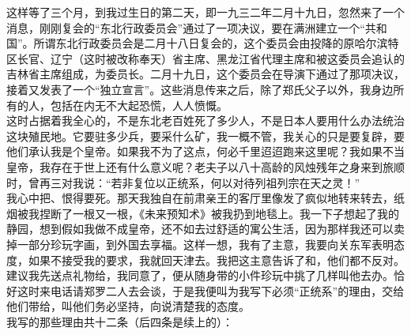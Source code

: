 这样等了三个月，到我过生日的第二天，即一九三二年二月十九日，忽然来了一个消息，刚刚复会的“东北行政委员会”通过了一项决议，要在满洲建立一个“共和国”。所谓东北行政委员会是二月十八日复会的，这个委员会由投降的原哈尔滨特区长官、辽宁（这时被改称奉天）省主席、黑龙江省代理主席和被这委员会追认的吉林省主席组成，为委员长。二月十九日，这个委员会在导演下通过了那项决议，接着又发表了一个“独立宣言”。这些消息传来之后，除了郑氏父子以外，我身边所有的人，包括在内无不大起恐慌，人人愤慨。\\

这时占据着我全心的，不是东北老百姓死了多少人，不是日本人要用什么办法统治这块殖民地。它要驻多少兵，要采什么矿，我一概不管，我关心的只是要复辟，要他们承认我是个皇帝。如果我不为了这点，何必千里迢迢跑来这里呢？我如果不当皇帝，我存在于世上还有什么意义呢？老夫子以八十高龄的风烛残年之身来到旅顺时，曾再三对我说：“若非复位以正统系，何以对待列祖列宗在天之灵！”\\

我心中把、恨得要死。那天我独自在前肃亲王的客厅里像发了疯似地转来转去，纸烟被我捏断了一根又一根，《未来预知术》被我扔到地毯上。我一下子想起了我的静园，想到假如我做不成皇帝，还不如去过舒适的寓公生活，因为那样我还可以卖掉一部分珍玩字画，到外国去享福。这样一想，我有了主意，我要向关东军表明态度，如果不接受我的要求，我就回天津去。我把这主意告诉了和，他们都不反对。建议我先送点礼物给，我同意了，便从随身带的小件珍玩中挑了几样叫他去办。恰好这时来电话请郑罗二人去会谈，于是我便叫为我写下必须“正统系”的理由，交给他们带给，叫他们务必坚持，向说清楚我的态度。\\

我写的那些理由共十二条（后四条是续上的）：\\


